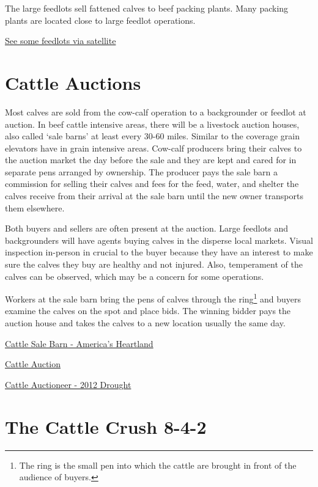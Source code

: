 \documentclass[
]{book}
\begin{document}
The large feedlots sell fattened calves to beef packing plants. Many packing plants are located close to large feedlot operations.

\href{http://maps.google.com}{See some feedlots via satellite}

\hypertarget{cattle-auctions}{%
\section{Cattle Auctions}\label{cattle-auctions}}

Most calves are sold from the cow-calf operation to a backgrounder or feedlot at auction. In beef cattle intensive areas, there will be a livestock auction houses, also called `sale barns' at least every 30-60 miles. Similar to the coverage grain elevators have in grain intensive areas. Cow-calf producers bring their calves to the auction market the day before the sale and they are kept and cared for in separate pens arranged by ownership. The producer pays the sale barn a commission for selling their calves and fees for the feed, water, and shelter the calves receive from their arrival at the sale barn until the new owner transports them elsewhere.

Both buyers and sellers are often present at the auction. Large feedlots and backgrounders will have agents buying calves in the disperse local markets. Visual inspection in-person in crucial to the buyer because they have an interest to make sure the calves they buy are healthy and not injured. Also, temperament of the calves can be observed, which may be a concern for some operations.

Workers at the sale barn bring the pens of calves through the ring\footnote{The ring is the small pen into which the cattle are brought in front of the audience of buyers.} and buyers examine the calves on the spot and place bids. The winning bidder pays the auction house and takes the calves to a new location usually the same day.

\href{https://www.youtube.com/watch?v=m0iiTk3MQ3k}{Cattle Sale Barn - America's Heartland}

\href{https://www.youtube.com/watch?v=ACKT5jWJHTI}{Cattle Auction}

\href{https://www.youtube.com/watch?v=Ig514nyWQho}{Cattle Auctioneer - 2012 Drought}

\hypertarget{the-cattle-crush-8-4-2}{%
\section{The Cattle Crush 8-4-2}\label{the-cattle-crush-8-4-2}}
\end{document}
